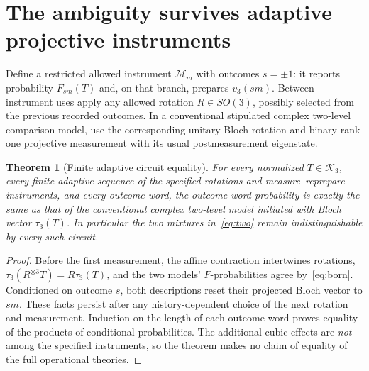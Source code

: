 \documentclass[10.5pt,letterpaper]{article}
\newtheorem{theorem}{Theorem}
\newcommand{\KK}{\mathcal{K}}
\begin{document}
\section{The ambiguity survives adaptive projective instruments}
Define a restricted allowed instrument $\mathcal{M}_m$ with outcomes $s=\pm1$: it reports probability $F_{sm}(T)$ and, on that branch, prepares $v_3(sm)$. Between instrument uses apply any allowed rotation $R\in SO(3)$, possibly selected from the previous recorded outcomes. In a conventional stipulated complex two-level comparison model, use the corresponding unitary Bloch rotation and binary rank-one projective measurement with its usual postmeasurement eigenstate.
\begin{theorem}[Finite adaptive circuit equality]\label{thm:adaptive}
For \emph{every} normalized $T\in\KK_3$, every finite adaptive sequence of the specified rotations and measure--reprepare instruments, and every outcome word, the outcome-word probability is exactly the same as that of the conventional complex two-level model initiated with Bloch vector $\tau_3(T)$. In particular the two mixtures in~\eqref{eq:two} remain indistinguishable by every such circuit.
\end{theorem}
\begin{proof}
Before the first measurement, the affine contraction intertwines rotations, $\tau_3(R^{\otimes3}T)=R\tau_3(T)$, and the two models' $F$-probabilities agree by~\eqref{eq:born}. Conditioned on outcome $s$, both descriptions reset their projected Bloch vector to $sm$. These facts persist after any history-dependent choice of the next rotation and measurement. Induction on the length of each outcome word proves equality of the products of conditional probabilities. The additional cubic effects are \emph{not} among the specified instruments, so the theorem makes no claim of equality of the full operational theories.
\end{proof}
\end{document}

